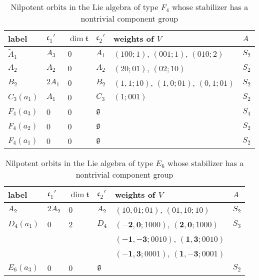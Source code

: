 \documentclass[a4paper,10pt]{amsart}
\newcommand{\mf}{\mathfrak}
\newcommand{\g}{\mf{g}}
\renewcommand{\c}{\mf{c}}
\newcommand{\wts}[2]{{({\scriptstyle{#1}};{\scriptstyle{#2}})}}
\newcommand{\ttt}{\mf{t}}
\numberwithin{equation}{section}
\theoremstyle{remark}
\theoremstyle{remark}
\begin{document}
\begin{longtable}{|l|l|l|l|l|l|}
\caption{Nilpotent orbits in the Lie algebra of type $F_4$ whose stabilizer
  has a nontrivial component group}\label{tab:F4} 
\endfirsthead
\hline
\endhead
\hline
\endfoot
\endlastfoot

\hline
label & $\c_1'$ & $\dim \ttt$ & $\c_2'$ & weights of $V$ & $A$\\
\hline
$\widetilde{A}_1$ & $A_3$ & 0 & $A_1$ & $\wts{100}{1}$, $\wts{001}{1}$,
$\wts{010}{2}$ & $S_2$\\
$A_2$ & $A_2$ & 0 & $A_2$& $\wts{20}{01}$, $\wts{02}{10}$ & $S_2$\\
$B_2$ & $2A_1$ & 0 & $B_2$ & $\wts{1,1}{10}$, $\wts{1,0}{01}$, $\wts{0,1}{01}$ &
$S_2$\\
$C_3(a_1)$ & $A_1$ & 0 & $C_3$ & $\wts{1}{001}$ & $S_2$\\
$F_4(a_3)$ & 0 & 0 & $\g$ & & $S_4$ \\
$F_4(a_2)$ & 0 & 0 & $\g$ & &  $S_2$\\
$F_4(a_1)$ & 0 & 0 & $\g$ & &  $S_2$\\
\hline  
\end{longtable}  

\begin{longtable}{|l|l|l|l|l|l|}
\caption{Nilpotent orbits in the Lie algebra of type $E_6$ whose stabilizer
  has a nontrivial component group}\label{tab:E6}  
\endfirsthead
\hline
\endhead
\hline
\endfoot
\endlastfoot

\hline
label & $\c_1'$ & $\dim\ttt$ & $\c_2'$ & weights of $V$ & $A$ \\
\hline
$A_2$ & $2A_2$ & 0 & $A_2$ & $\wts{10,01}{01}$, $\wts{01,10}{10}$ & $S_2$\\
$D_4(a_1)$ & 0 & 2 & $D_4$ & $\wts{{\mathbf{-2,0}}}{1000}$,
$\wts{{\mathbf{2,0}}}{1000}$ &  $S_3$\\
& & & &  $\wts{{\mathbf{-1,-3}}}{0010}$,  $\wts{{\mathbf{1,3}}}{0010}$ & \\
& & & &   $\wts{{\mathbf{-1,3}}}{0001}$,  $\wts{{\mathbf{1,-3}}}{0001}$ &\\
$E_6(a_3)$ & 0 & 0 & $\g$ & & $S_2$ \\
\hline  
\end{longtable}  
\end{document}
